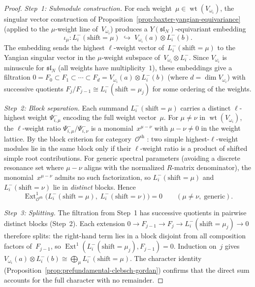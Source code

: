 \begin{proof}
\emph{Step~1: Submodule construction.}
For each weight~$\mu \in \operatorname{wt}(V_{\omega_i})$,
the singular vector construction of
Proposition~\ref{prop:baxter-yangian-equivariance} (applied
to the $\mu$-weight line of~$V_{\omega_i}$) produces a
$Y(\mathfrak{sl}_N)$-equivariant embedding
\[
 \iota_\mu \colon
 L^-_i(\mathrm{shift} = \mu)
 \;\hookrightarrow\;
 V_{\omega_i}(a) \otimes L^-_i(b).
\]
The embedding sends the highest $\ell$-weight vector
of~$L^-_i(\mathrm{shift} = \mu)$ to the Yangian singular
vector in the $\mu$-weight subspace
of~$V_{\omega_i} \otimes L^-_i$.
Since $V_{\omega_i}$ is minuscule for $\mathfrak{sl}_N$
(all weights have multiplicity~$1$), these embeddings give a
filtration
$0 = F_0 \subset F_1 \subset \cdots \subset F_d
= V_{\omega_i}(a) \otimes L^-_i(b)$
(where $d = \dim V_{\omega_i}$) with successive quotients
$F_j / F_{j-1} \cong L^-_i(\mathrm{shift} = \mu_j)$ for
some ordering of the weights.

\emph{Step~2: Block separation.}
Each summand $L^-_i(\mathrm{shift} = \mu)$ carries a distinct
$\ell$-highest weight $\Psi^-_{i,\mu}$ encoding the full
weight vector~$\mu$. For $\mu \neq \nu$ in
$\operatorname{wt}(V_{\omega_i})$, the $\ell$-weight ratio
$\Psi^-_{i,\mu} / \Psi^-_{i,\nu}$ is a monomial~$x^{\mu - \nu}$
with $\mu - \nu \neq 0$ in the weight lattice.
By the block criterion for category~$\mathcal{O}^{\mathrm{sh}}$
\cite{Hernandez05, HJZ25}: two simple highest-$\ell$-weight
modules lie in the same block only if their $\ell$-weight ratio
is a product of shifted simple root contributions. For
generic spectral parameters (avoiding a discrete resonance set
where $\mu - \nu$ aligns with the normalized $R$-matrix
denominator), the monomial~$x^{\mu - \nu}$ admits no such
factorization, so $L^-_i(\mathrm{shift} = \mu)$ and
$L^-_i(\mathrm{shift} = \nu)$ lie in \emph{distinct} blocks.
Hence
\[
\operatorname{Ext}^1_{\mathcal{O}^{\mathrm{sh}}}
\!\bigl(L^-_i(\mathrm{shift} = \mu),\;
 L^-_i(\mathrm{shift} = \nu)\bigr) = 0
\qquad (\mu \neq \nu,\;\text{generic}).
\]

\emph{Step~3: Splitting.}
The filtration from Step~1 has successive quotients in
pairwise distinct blocks (Step~2). Each extension
$0 \to F_{j-1} \to F_j \to
L^-_i(\mathrm{shift} = \mu_j) \to 0$
therefore splits: the right-hand term lies in a block disjoint
from all composition factors of~$F_{j-1}$, so
$\operatorname{Ext}^1(L^-_i(\mathrm{shift} = \mu_j),
F_{j-1}) = 0$.
Induction on~$j$ gives
$V_{\omega_i}(a) \otimes L^-_i(b)
\cong \bigoplus_\mu L^-_i(\mathrm{shift} = \mu)$.
The character identity
(Proposition~\ref{prop:prefundamental-clebsch-gordan}) confirms
that the direct sum accounts for the full character with no
remainder.
\end{proof}

